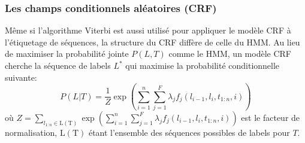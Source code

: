 \subsubsection{Les champs conditionnels aléatoires (CRF)}
\label{sec:structuration:litérature-CRF}

Même si l'algorithme Viterbi est aussi utilisé pour appliquer le modèle CRF à l'étiquetage de séquences, la structure du CRF diffère de celle du HMM. Au lieu de maximiser la probabilité jointe $ P(L, T)$ comme le HMM, un modèle CRF \citep{lafferty2001crfie} cherche la séquence de labels $L^*$ qui maximise la probabilité conditionnelle suivante: \[P(L|T) = \frac{1}{Z}\exp \left(\sum\limits_{i=1}^n\sum\limits_{j=1}^F \lambda_j f_j(l_{i-1},l_i,t_{1:n},i)\right)\] où $Z = \sum\limits_{l_{1:n} \in \mathrm{L(T)}}\exp \left(\sum\limits_{i=1}^n\sum\limits_{j=1}^F \lambda_j f_j(l_{i-1},l_i,t_{1:n},i)\right)$ est le facteur de normalisation, $\mathrm{L(T)}$ étant l'ensemble des séquences possibles de labels pour $T$.

